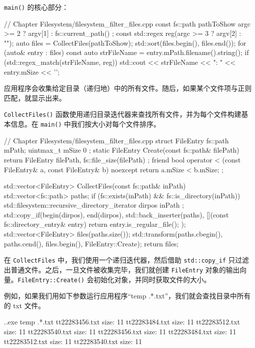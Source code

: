 \texttt{main()} 的核心部分：

\begin{codebox}[cpp]
// Chapter Filesystem/filesystem_filter_files.cpp
const fs::path pathToShow{ argc >= 2 ? argv[1] : fs::current_path() };
const std::regex reg(argc >= 3 ? argv[2] : "");
auto files = CollectFiles(pathToShow);
std::sort(files.begin(), files.end());
for (auto& entry : files)
{
    const auto strFileName = entry.mPath.filename().string();
    if (std::regex_match(strFileName, reg))
        std::cout << strFileName << "\tsize: " << entry.mSize << '\n';
}
\end{codebox}

应用程序会收集给定目录（递归地）中的所有文件。随后，如果某个文件项与正则匹配，就显示出来。

\texttt{CollectFiles()} 函数使用递归目录迭代器来查找所有文件，并为每个文件构建基本信息。在 \texttt{main()} 中我们按大小对每个文件排序。

\begin{codebox}[cpp]
// Chapter Filesystem/filesystem_filter_files.cpp
struct FileEntry
{
    fs::path mPath;
    uintmax_t mSize{ 0 };
    static FileEntry Create(const fs::path& filePath) {
        return FileEntry{ filePath, fs::file_size(filePath) };
    }
    friend bool operator < (const FileEntry& a, const FileEntry& b) noexcept {
        return a.mSize < b.mSize;
    }
};

std::vector<FileEntry> CollectFiles(const fs::path& inPath)
{
    std::vector<fs::path> paths;
    if (fs::exists(inPath) && fs::is_directory(inPath))
    {
        std::filesystem::recursive_directory_iterator dirpos{ inPath };
        std::copy_if(begin(dirpos), end(dirpos), std::back_inserter(paths),
            [](const fs::directory_entry& entry) {
                return entry.is_regular_file();
            }
        );
    }
    std::vector<FileEntry> files(paths.size());
    std::transform(paths.cbegin(), paths.cend(), files.begin(), FileEntry::Create);
    return files;
}
\end{codebox}

在 \texttt{CollectFiles} 中，我们使用一个递归迭代器，然后借助 \texttt{std::copy\_if} 只过滤出普通文件。之后，一旦文件被收集完毕，我们就创建 \texttt{FileEntry} 对象的输出向量。\texttt{FileEntry::Create()} 会初始化对象，并同时获取文件的大小。

例如，如果我们用如下参数运行应用程序“temp .*.txt”，我们就会查找目录中所有的 txt 文件。

\begin{codebox}[cpp]
.\FilterFiles.exe temp .*.txt
tt22283456.txt
  size: 11
tt22283484.txt
  size: 11
tt22283512.txt
  size: 11
tt22283540.txt
  size: 11
tt22283456.txt
  size: 11
tt22283484.txt
  size: 11
tt22283512.txt
  size: 11
tt22283540.txt
  size: 11
\end{codebox}

